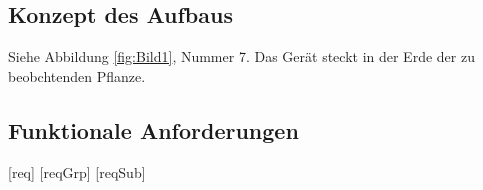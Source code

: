 \documentclass[pointlessnumbers]{scrartcl}
\begin{document}
\subsection{Konzept des Aufbaus}
Siehe Abbildung \ref{fig:Bild1}, Nummer 7. Das Gerät steckt in der Erde der zu beobchtenden Pflanze.


\subsection{Funktionale Anforderungen}

\newcommand{\BreiteErsterTab}{3cm}
\newcommand{\BreiteZweiterTab}{10cm}






[req] 
[reqGrp] 
[reqSub] 

\renewcommand\thereq{/F\arabic{req}000/} 
\renewcommand\thereqGrp{/F\arabic{req}\arabic{reqGrp}00/} 
\renewcommand\thereqSub{/F\arabic{req}\arabic{reqGrp}\arabic{reqSub}0/} 
\renewcommand\thereqProc{/F\arabic{req}\arabic{reqGrp}\arabic{reqSub}\arabic{reqProc}/} 




\newcommand{\requirement}[2]{%
  \refstepcounter{req}
  \label{#1} 
  \thereq~#2
} 

\newcommand{\requirementGroup}[2]{%
  \refstepcounter{reqGrp}
  \label{#1} 
  \thereqGrp~#2
} 

\newcommand{\requirementSubGroup}[2]{%
  \refstepcounter{reqSub}
  \label{#1} 
  \thereqSub~#2
} 

\newcommand{\requirementProcess}[2]{%
  \refstepcounter{reqProc}
  \label{#1} 
  \thereqProc~#2
} 




    
\end{document}
